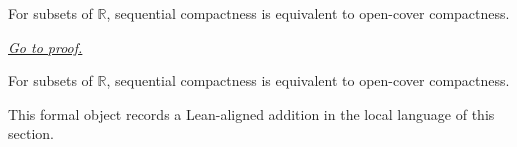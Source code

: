\begin{dependencies}
\NoLocalDependencies
\end{dependencies}
\begin{theorem}
\label{thm:sequential-compactness-iff-open-cover-compactness}
For subsets of $\mathbb R$, sequential compactness is equivalent to open-cover compactness.

\smallskip
\noindent
\hyperref[prf:sequential-compactness-iff-open-cover-compactness]{\textit{Go to proof.}}
\end{theorem}

\begin{remark*}
For subsets of $\mathbb R$, sequential compactness is equivalent to open-cover compactness.
\end{remark*}

\begin{remark*}[Interpretation]
This formal object records a Lean-aligned addition in the local language of this section.
\end{remark*}

\begin{dependencies}
\NoLocalDependencies
\end{dependencies}
